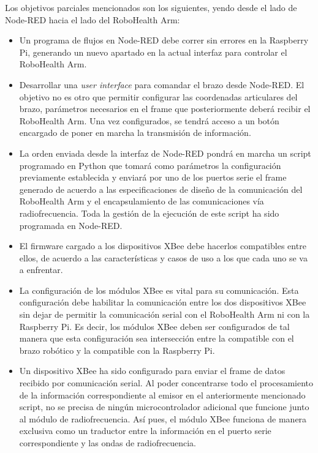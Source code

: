 Los objetivos parciales mencionados son los siguientes, yendo desde el lado de Node-RED hacia el lado del RoboHealth Arm:

\begin{itemize}

\item Un programa de flujos en Node-RED debe correr sin errores en la Raspberry Pi, generando un nuevo apartado en la actual interfaz para controlar el RoboHealth Arm.

\item Desarrollar una \textit{user interface} para comandar el brazo desde Node-RED. El objetivo no es otro que permitir configurar las coordenadas articulares del brazo, parámetros necesarios en el frame que posteriormente deberá recibir el RoboHealth Arm. Una vez configurados, se tendrá acceso a un botón encargado de poner en marcha la transmisión de información.

\item La orden enviada desde la interfaz de Node-RED pondrá en marcha un script programado en Python que tomará como parámetros la configuración previamente establecida y enviará por uno de los puertos serie el frame generado de acuerdo a las especificaciones de diseño de la comunicación del RoboHealth Arm y el encapsulamiento de las comunicaciones vía radiofrecuencia. Toda la gestión de la ejecución de este script ha sido programada en Node-RED.

\item El firmware cargado a los dispositivos XBee debe hacerlos compatibles entre ellos, de acuerdo a las características y casos de uso a los que cada uno se va a enfrentar.

\item La configuración de los módulos XBee es vital para su comunicación. Esta configuración debe habilitar la comunicación entre los dos dispositivos XBee sin dejar de permitir la comunicación serial con el RoboHealth Arm ni con la Raspberry Pi. Es decir, los módulos XBee deben ser configurados de tal manera que esta configuración sea intersección entre la compatible con el brazo robótico y la compatible con la Raspberry Pi.

\item Un dispositivo XBee ha sido configurado para enviar el frame de datos recibido por comunicación serial. Al poder concentrarse todo el procesamiento de la información correspondiente al emisor en el anteriormente mencionado script, no se precisa de ningún microcontrolador adicional que funcione junto al módulo de radiofrecuencia. Así pues, el módulo XBee funciona de manera exclusiva como un traductor entre la información en el puerto serie correspondiente y las ondas de radiofrecuencia.


\end{itemize}
